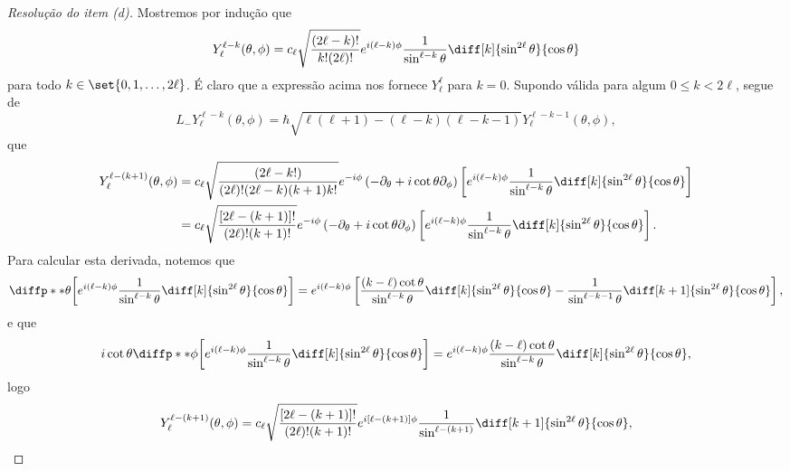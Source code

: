 \begin{proof}[Resolução do item (d)]
    Mostremos por indução que
    \begin{equation*}
        Y_\ell^{\ell - k}(\theta,\phi) = c_\ell \sqrt{\frac{(2\ell - k)!}{k! (2\ell)!}} e^{i(\ell - k)\phi}\frac{1}{\sin^{\ell - k}\theta} \diff[k]{\sin^{2\ell}\theta}{\cos\theta}
    \end{equation*}
    para todo \(k \in \set{0,1,\dots,2\ell}\). É claro que a expressão acima nos fornece \(Y_\ell^\ell\) para \(k = 0\). Supondo válida para algum \(0 \leq k < 2\ell\), segue de
    \begin{equation*}
        L_-Y_\ell^{\ell - k}(\theta, \phi) = \hbar\sqrt{\ell(\ell + 1) - (\ell - k)(\ell - k - 1)}Y_\ell^{\ell - k - 1}(\theta,\phi),
    \end{equation*}
    que
    \begin{align*}
        Y_\ell^{\ell - (k + 1)}(\theta,\phi) &= c_\ell\sqrt{\frac{(2\ell - k!)}{(2\ell)!(2\ell - k)(k + 1)k!}}e^{-i\phi}\left(- \partial_\theta + i\cot \theta\partial_\phi\right)\left[e^{i(\ell-k) \phi} \frac{1}{\sin^{\ell - k}\theta}\diff[k]{\sin^{2\ell}\theta}{\cos\theta}\right]\\
                                             &= c_\ell \sqrt{\frac{[2\ell - (k+1)]!}{(2\ell)! (k+1)!}} e^{-i\phi} \left(- \partial_\theta + i\cot \theta\partial_\phi\right)\left[e^{i(\ell-k) \phi} \frac{1}{\sin^{\ell - k}\theta}\diff[k]{\sin^{2\ell}\theta}{\cos\theta}\right].
    \end{align*}
    Para calcular esta derivada, notemos que
    \begin{equation*}
        \diffp**\theta{\left[e^{i(\ell - k)\phi}\frac{1}{\sin^{\ell - k}\theta} \diff[k]{\sin^{2\ell}\theta}{\cos\theta}\right]} = e^{i(\ell - k)\phi}\left[\frac{(k - \ell)\cot\theta}{\sin^{\ell - k}\theta}\diff[k]{\sin^{2\ell}\theta}{\cos\theta} - \frac{1}{\sin^{\ell - k - 1}\theta}\diff[k+1]{\sin^{2\ell}\theta}{\cos\theta}\right],
    \end{equation*}
    e que
    \begin{equation*}
        i\cot\theta \diffp**\phi{\left[e^{i(\ell - k)\phi}\frac{1}{\sin^{\ell - k}\theta} \diff[k]{\sin^{2\ell}\theta}{\cos\theta}\right]} = e^{i(\ell - k)\phi}\frac{(k - \ell)\cot\theta}{\sin^{\ell - k}\theta} \diff[k]{\sin^{2\ell}\theta}{\cos\theta},
    \end{equation*}
    logo
    \begin{equation*}
        Y_{\ell}^{\ell - (k+1)}(\theta, \phi) = c_\ell\sqrt{\frac{[2\ell - (k+1)]!}{(2\ell)! (k+1)!}} e^{i[\ell - (k+1)]\phi}\frac{1}{\sin^{\ell - (k + 1)}}\diff[k+1]{\sin^{2\ell}\theta}{\cos\theta},

\end{equation*}
\end{proof}
